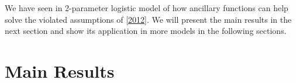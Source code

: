 \documentclass[11pt]{amsart}
\theoremstyle{definition}
\theoremstyle{remark}
\begin{document}

 

 
 We have seen in 2-parameter logistic model of how ancillary functions can help solve the violated assumptions of \ref{2012}. We will present the main results in the next section and show its application in more models in the following sections.
 
 



\section{Main Results}
\end{document}
